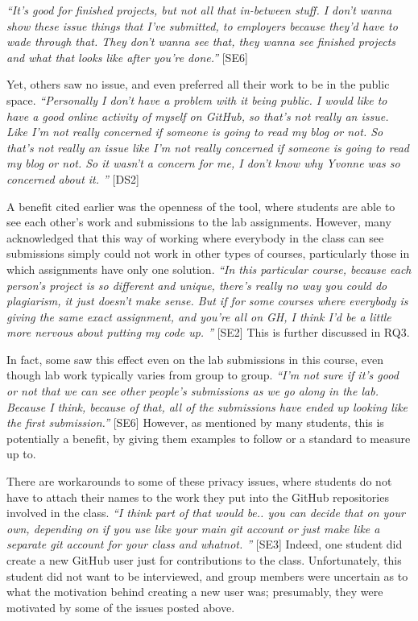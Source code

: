 \textit{``It's good for finished projects, but not all that in-between stuff. I don't wanna show these issue things that I've submitted, to employers because they'd have to wade through that. They don't wanna see that, they wanna see finished projects and what that looks like after you're done.''} [SE6]

Yet, others saw no issue, and even preferred all their work to be in the public space. \textit{``Personally I don't have a problem with it being public. I would like to have a good online activity of myself on GitHub, so that's not really an issue. Like I'm not really concerned if someone is going to read my blog or not. So that's not really an issue like I'm not really concerned if someone is going to read my blog or not. So it wasn't a concern for me, I don't know why Yvonne was so concerned about it. ''} [DS2]

A benefit cited earlier was the openness of the tool, where students are able to see each other's work and submissions to the lab assignments. However, many acknowledged that this way of working where everybody in the class can see submissions simply could not work in other types of courses, particularly those in which assignments have only one solution. \textit{``In this particular course, because each person's project is so different and unique, there's really no way you could do plagiarism, it just doesn't make sense. But if for some courses where everybody is giving the same exact assignment, and you're all on GH, I think I'd be a little more nervous about putting my code up. ''} [SE2] This is further discussed in RQ3.

In fact, some saw this effect even on the lab submissions in this course, even though lab work typically varies from group to group. \textit{``I'm not sure if it's good or not that we can see other people's submissions as we go along in the lab. Because I think, because of that, all of the submissions have ended up looking like the first submission.''} [SE6] However, as mentioned by many students, this is potentially a benefit, by giving them examples to follow or a standard to measure up to.

There are workarounds to some of these privacy issues, where students do not have to attach their names to the work they put into the GitHub repositories involved in the class. \textit{``I think part of that would be.. you can decide that on your own, depending on if you use like your main git account or just make like a separate git account for your class and whatnot. ''} [SE3] Indeed, one student did create a new GitHub user just for contributions to the class. Unfortunately, this student did not want to be interviewed, and group members were uncertain as to what the motivation behind creating a new user was; presumably, they were motivated by some of the issues posted above.

